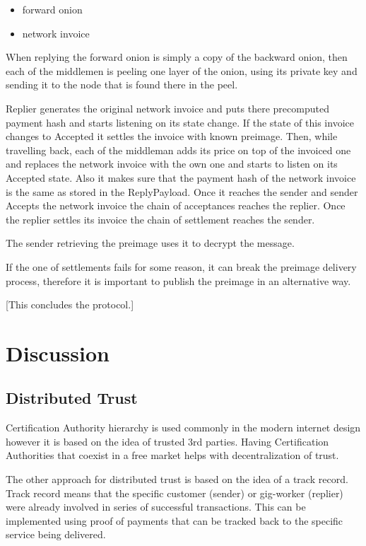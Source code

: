 \documentclass{article}
\begin{document}
\begin{itemize}
	\item  forward onion
	\item  network invoice
\end{itemize}

When replying the forward onion is simply a copy of the backward onion, then each of the middlemen is peeling one layer of the onion, using its private key and sending it to the node that is found there in the peel.

Replier generates the original network invoice and puts there precomputed payment hash and starts listening on its state change. If the state of this invoice changes to Accepted it settles the invoice with known preimage.
Then, while travelling back, each of the middleman adds its price on top of the invoiced one and replaces the network invoice with the own one and starts to listen on its Accepted state. Also it makes sure that the payment hash of the network invoice is the same as stored in the ReplyPayload.
Once it reaches the sender and sender Accepts the network invoice the chain of acceptances reaches the replier. Once the replier settles its invoice the chain of settlement reaches the sender.

The sender retrieving the preimage uses it to decrypt the message.

If the one of settlements fails for some reason, it can break the preimage delivery process, therefore it is important to publish the preimage in an alternative way.

[This concludes the protocol.]

\section{Discussion}

\subsection{Distributed Trust}

Certification Authority hierarchy is used commonly in the modern internet design however it is based on the idea of trusted 3rd parties. Having Certification Authorities that coexist in a free market helps with decentralization of trust.

The other approach for distributed trust is based on the idea of a track record. Track record means that the specific customer (sender) or gig-worker (replier) were already involved in series of successful transactions. This can be implemented using proof of payments that can be tracked back to the specific service being delivered.
\end{document}
